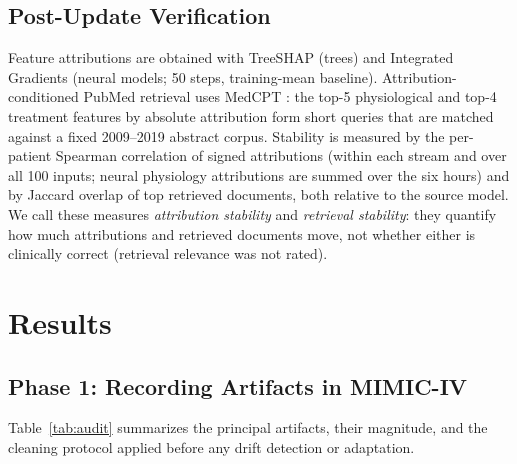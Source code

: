 \documentclass[10pt,a4paper,twocolumn]{article}
\begin{document}
	\subsection{Post-Update Verification}
	Feature attributions are obtained with TreeSHAP (trees) and Integrated Gradients (neural models; 50 steps, training-mean baseline). Attribution-conditioned PubMed retrieval uses MedCPT \citep{jin2023medcpt}: the top-5 physiological and top-4 treatment features by absolute attribution form short queries that are matched against a fixed 2009--2019 abstract corpus. Stability is measured by the per-patient Spearman correlation of signed attributions (within each stream and over all 100 inputs; neural physiology attributions are summed over the six hours) and by Jaccard overlap of top retrieved documents, both relative to the source model. We call these measures \emph{attribution stability} and \emph{retrieval stability}: they quantify how much attributions and retrieved documents move, not whether either is clinically correct (retrieval relevance was not rated).
	
	\section{Results}
	
	\subsection{Phase 1: Recording Artifacts in MIMIC-IV}
	\label{sec:res_audit}
	
	Table~\ref{tab:audit} summarizes the principal artifacts, their magnitude, and the cleaning protocol applied before any drift detection or adaptation.
	
\end{document}
